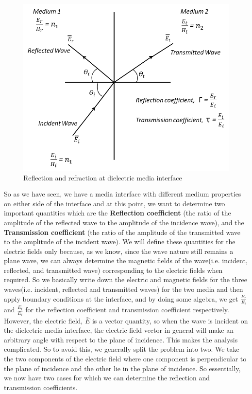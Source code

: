 \begin{figure}[h]
\centering
\includegraphics[width=1\linewidth]{graphics/reflection_refraction1}
\caption{Reflection and refraction at dielectric media interface}
\label{fg:11}
\end{figure}

So as we have seen, we have a media interface with different medium properties on either side of the interface and at this point, we want to determine two important quantities which are the \textbf{Reflection coefficient} (the ratio of the amplitude of the reflected wave to the amplitude of the incidence wave), and the \textbf{Transmission coefficient} (the ratio of the amplitude of the transmitted wave to the amplitude of the incident wave). We will define these quantities for the electric fields only because, as we know, since the wave nature still remains a plane wave, we can always determine the magnetic fields of the wave(i.e. incident, reflected, and transmitted wave) corresponding to the electric fields when required.
So we basically write down the electric and magnetic fields for the three waves(i.e. incident, reflected and transmitted waves) for the two media and then apply boundary conditions at the interface, and by doing some algebra, we get $\frac{E_{r}}{E_{i}}$ and $\frac{E_{t}}{E_{i}}$ for the reflection coefficient and transmission coefficient respectively. However, the electric field, $\bar{E}$ is a vector quantity, so when the wave is incident on the dielectric media interface, the electric field vector in general will make an arbitrary angle with respect to the plane of incidence. This makes the analysis complicated. So to avoid this, we generally split the problem into two. We take the two components of the electric field where one component is perpendicular to the plane of incidence and the other lie in the plane of incidence.
So essentially, we now have two cases for which we can determine the reflection and transmission coefficients.

